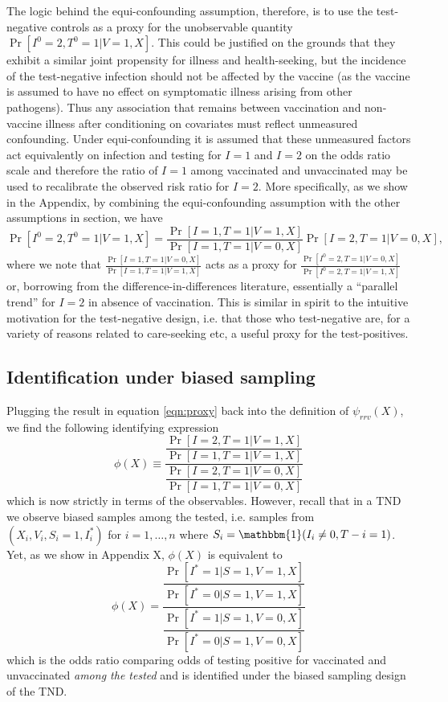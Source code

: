\documentclass[11pt]{article}
\begin{document}
The logic behind the equi-confounding assumption, therefore, is to use the test-negative controls as a proxy for the unobservable quantity $\Pr[I^0 = 2, T^0 = 1 | V = 1, X]$. This could be justified on the grounds that they exhibit a similar joint propensity for illness and health-seeking, but the incidence of the test-negative infection should not be affected by the vaccine (as the vaccine is assumed to have no effect on symptomatic illness arising from other pathogens). Thus any association that remains between vaccination and non-vaccine illness after conditioning on covariates must reflect unmeasured confounding. Under equi-confounding it is assumed that these unmeasured factors act equivalently on infection and testing for $I=1$ and $I=2$ on the odds ratio scale and therefore the ratio of $I=1$ among vaccinated and unvaccinated may be used to recalibrate the observed risk ratio for $I = 2$. More specifically, as we show in the Appendix, by combining the equi-confounding assumption with the other assumptions in section, we have
    \begin{equation}\label{eqn:proxy}
     \Pr[I^0 = 2, T^0 = 1  | V = 1, X] = \frac{\Pr[I = 1, T = 1  | V = 1, X]}{\Pr[I = 1, T = 1  | V = 0, X]}\Pr[I = 2, T = 1 | V = 0, X],
    \end{equation}
where we note that $\frac{\Pr[I = 1, T =1  | V = 0, X]}{\Pr[I = 1, T = 1 | V = 1, X]}$ acts as a proxy for $\frac{\Pr[I^0 = 2, T =1  | V = 0, X]}{\Pr[I^0 = 2, T = 1 | V = 1, X]}$ or, borrowing from the difference-in-differences literature, essentially a ``parallel trend'' for $I=2$ in absence of vaccination. This is similar in spirit to the intuitive motivation for the test-negative design, i.e. that those who test-negative are, for a variety of reasons related to care-seeking etc, a useful proxy for the test-positives.

\subsection{Identification under biased sampling}
Plugging the result in equation \ref{eqn:proxy} back into the definition of $\psi_{rrv}(X)$, we find the following identifying expression 
    \begin{equation*}
         \phi(X) \equiv \dfrac{\dfrac{\Pr[I = 2, T = 1 | V = 1, X]}{\Pr[I = 1, T = 1 | V = 1, X]}}{\dfrac{\Pr[I = 2, T = 1 | V = 0, X]}{\Pr[I = 1, T = 1 | V = 0, X]}}
    \end{equation*}
which is now strictly in terms of the observables. However, recall that in a TND we observe biased samples among the tested, i.e. samples from $(X_i, V_i, S_i = 1, I^*_i)$ for $i = 1, \ldots, n$ where $S_i = \mathbbm{1}(I_i \neq 0, T-i = 1)$. Yet, as we show in Appendix X, $\phi(X)$ is equivalent to 
    \begin{equation}
         \phi(X) = \dfrac{\dfrac{\Pr[I^* = 1 | S = 1, V = 1, X]}{\Pr[I^* = 0 | S = 1, V = 1, X]}}{\dfrac{\Pr[I^* = 1 | S = 1, V = 0, X]}{\Pr[I^* = 0 | S = 1, V = 0, X]}}
    \end{equation}    
which is the odds ratio comparing odds of testing positive for vaccinated and unvaccinated \textit{among the tested} and is identified under the biased sampling design of the TND.
\end{document}

